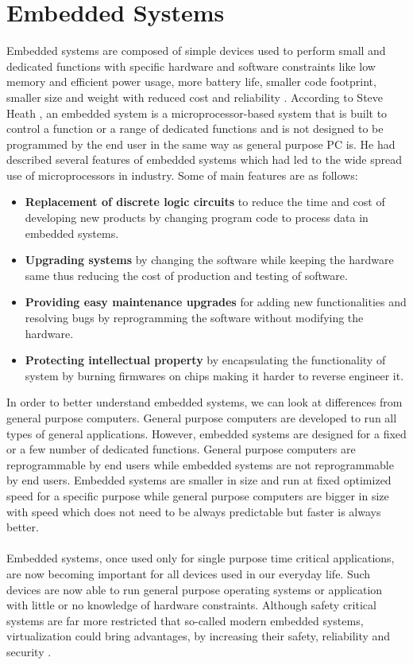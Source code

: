 \section{Embedded Systems \label{sec:standard}}
Embedded systems are composed of simple devices used to perform small and dedicated functions with specific hardware and software constraints like low memory and efficient power usage, more battery life, smaller code footprint, smaller size and weight with reduced cost and reliability \cite{koopman1990design}. According to Steve Heath \cite{heath_2005}, an embedded system is a microprocessor-based system that is built to control a function or a range of dedicated functions and is not designed to be programmed by the end user in the same way as general purpose PC is. He had described several features of embedded systems which had led to the wide spread use of microprocessors in industry. Some of main features are as follows:
\begin{itemize}
	\item \textbf{Replacement of discrete logic circuits} to reduce the time and cost of developing new products by changing program code to process data in embedded systems.
	\item \textbf{Upgrading systems} by changing the software while keeping the hardware same thus reducing the cost of production and testing of software.
	\item \textbf{Providing easy maintenance upgrades} for adding new functionalities and resolving bugs by reprogramming the software without modifying the hardware.
	\item \textbf{Protecting intellectual property} by encapsulating the functionality of system by burning firmwares on chips making it harder to reverse engineer it.
\end{itemize}
In order to better understand embedded systems, we can look at differences from general purpose computers. General purpose computers are developed to run all types of general applications. However, embedded systems are designed for a fixed or a few number of dedicated functions. General purpose computers are reprogrammable by end users while embedded systems are not reprogrammable by end users. Embedded systems are smaller in size and run at fixed optimized speed for a specific purpose while general purpose computers are bigger in size with speed which does not need to be always predictable but faster is always better.
\\
\\
Embedded systems, once used only for single purpose time critical applications, are now becoming important for all devices used in our everyday life. Such devices are now able to run general purpose operating systems or application with little or no knowledge of hardware constraints. Although safety critical systems are far more restricted that so-called modern embedded systems, virtualization could bring advantages, by increasing their safety, reliability and security \cite{aguiar_hessel_2010}.

